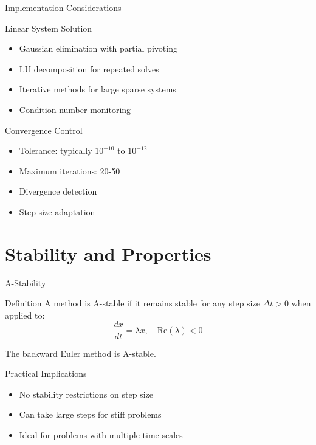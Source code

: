 \documentclass[10pt]{beamer}
\begin{document}
\begin{frame}{Implementation Considerations}
\begin{block}{Linear System Solution}
\begin{itemize}
\item Gaussian elimination with partial pivoting
\item LU decomposition for repeated solves
\item Iterative methods for large sparse systems
\item Condition number monitoring
\end{itemize}
\end{block}

\begin{block}{Convergence Control}
\begin{itemize}
\item Tolerance: typically $10^{-10}$ to $10^{-12}$
\item Maximum iterations: 20-50
\item Divergence detection
\item Step size adaptation
\end{itemize}
\end{block}
\end{frame}

\section{Stability and Properties}

\begin{frame}{A-Stability}
\begin{block}{Definition}
A method is A-stable if it remains stable for any step size $\Delta t > 0$ when applied to:
\begin{equation}
\frac{dx}{dt} = \lambda x, \quad \text{Re}(\lambda) < 0
\end{equation}
\end{block}

\begin{theorem}
The backward Euler method is A-stable.
\end{theorem}

\pause
\begin{block}{Practical Implications}
\begin{itemize}
\item No stability restrictions on step size
\item Can take large steps for stiff problems
\item Ideal for problems with multiple time scales
\end{itemize}
\end{block}
\end{frame}
\end{document}
